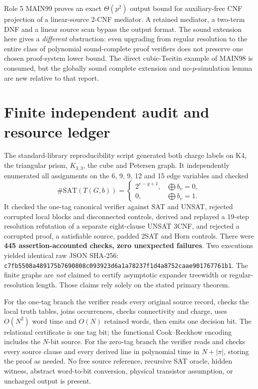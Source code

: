 \documentclass[11pt]{article}
\begin{document}
Role 5 MAIN99 proves an exact $\Theta(p^2)$ output bound
for auxiliary-free CNF projection of a linear-source 2-CNF
mediator. A retained mediator, a two-term DNF and a linear
source scan bypass the output format. The sound extension
here gives a \emph{different} obstruction: even upgrading
from regular resolution to the entire class of polynomial
sound-complete proof verifiers does not preserve one chosen
proof-system lower bound. The direct cubic-Tseitin example
of MAIN98 is consumed, but the globally sound complete
extension and no-$p$-simulation lemma are new relative to
that report.

\section{Finite independent audit and resource ledger}
The standard-library reproducibility script generated
both charge labels on K4, the triangular prism,
$K_{3,3}$, the cube and Petersen graph. It independently
enumerated all assignments on the 6, 9, 9, 12 and 15
edge variables and checked
\[
\#\mathrm{SAT}(T(G,b))=
\begin{cases}
2^{e-g+1},&\bigoplus b_v=0,\\
0,&\bigoplus b_v=1.
\end{cases}
\]
It checked the one-tag canonical verifier against SAT
and UNSAT, rejected corrupted local blocks and disconnected
controls, derived and replayed a 19-step resolution
refutation of a separate eight-clause UNSAT 3CNF,
and rejected a corrupted proof, a satisfiable source,
padded 2SAT and Horn controls. There were \textbf{445
assertion-accounted checks, zero unexpected failures}.
Two executions yielded identical raw JSON SHA-256:
\texttt{c7fb5508a489175b7690808c093923d6a1a78237f1d4a8752caae901767761b1}.
The finite graphs are \emph{not} claimed to certify
asymptotic expander treewidth or regular-resolution length.
Those claims rely solely on the stated primary theorem.

For the one-tag branch the verifier reads every original
source record, checks the local truth tables, joins occurrences,
checks connectivity and charge, uses $O(N^2)$ word time and
$O(N)$ retained words, then emits one decision bit.
The relational certificate is one tag bit; the functional
Cook--Reckhow encoding includes the $N$-bit source.
For the zero-tag branch the verifier reads and checks
every source clause and every derived line in polynomial
time in $N+|\pi|$, storing the proof as needed.
No free source reference, recursive SAT oracle, hidden
witness, abstract word-to-bit conversion, physical
transistor assumption, or uncharged output is present.
\end{document}
